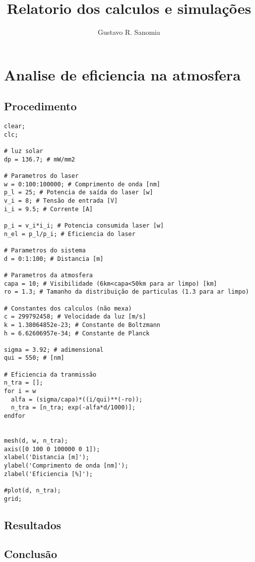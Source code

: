 \documentclass{article}
\title{Relatorio dos calculos e simulações}
\author{Gustavo R. Sanomia}
\date{}
\begin{document}
\section{Analise de eficiencia na atmosfera}
\subsection{Procedimento}
\begin{verbatim}
clear;
clc;

# luz solar
dp = 136.7; # mW/mm2

# Parametros do laser
w = 0:100:100000; # Comprimento de onda [nm]
p_l = 25; # Potencia de saída do laser [w]
v_i = 8; # Tensão de entrada [V]
i_i = 9.5; # Corrente [A]

p_i = v_i*i_i; # Potencia consumida laser [w]
n_el = p_l/p_i; # Eficiencia do laser

# Parametros do sistema
d = 0:1:100; # Distancia [m]

# Parametros da atmosfera
capa = 10; # Visibilidade (6km<capa<50km para ar limpo) [km]
ro = 1.3; # Tamanho da distribuição de particulas (1.3 para ar limpo)

# Constantes dos calculos (não mexa)
c = 299792458; # Velocidade da luz [m/s]
k = 1.38064852e-23; # Constante de Boltzmann
h = 6.62606957e-34; # Constante de Planck

sigma = 3.92; # adimensional
qui = 550; # [nm]

# Eficiencia da tranmissão
n_tra = [];
for i = w
  alfa = (sigma/capa)*((i/qui)**(-ro));
  n_tra = [n_tra; exp(-alfa*d/1000)];
endfor


mesh(d, w, n_tra);
axis([0 100 0 100000 0 1]);
xlabel('Distancia [m]');
ylabel('Comprimento de onda [nm]');
zlabel('Eficiencia [%]');

#plot(d, n_tra);
grid;
\end{verbatim}
\subsection{Resultados}
\subsection{Conclusão}
\end{document}

